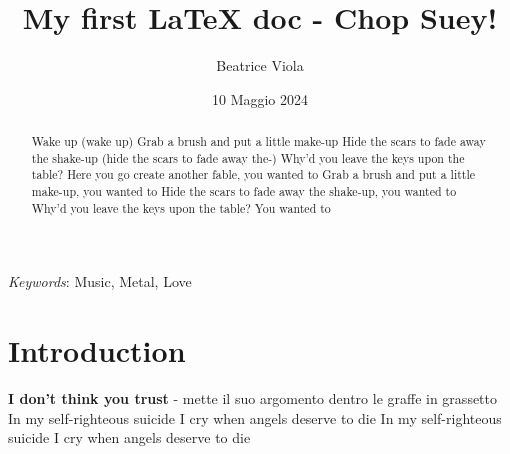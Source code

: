 \documentclass[12pt]{article}
\title{My first LaTeX doc - Chop Suey!}
\author{Beatrice Viola}
\date{10 Maggio 2024} %
\begin{document}

\maketitle %
\tableofcontents %

\begin{abstract}
 Wake up (wake up)
Grab a brush and put a little make-up
Hide the scars to fade away the shake-up (hide the scars to fade away the-)
Why'd you leave the keys upon the table?
Here you go create another fable, you wanted to
Grab a brush and put a little make-up, you wanted to
Hide the scars to fade away the shake-up, you wanted to
Why'd you leave the keys upon the table? You wanted to
\end{abstract}

\bigskip %

\textit{Keywords}: Music, Metal, Love %

\section{Introduction} %
\label{sec:intro} %

\textbf{I don't think you trust} - \textb mette il suo argomento dentro le graffe in grassetto
In my self-righteous suicide
I cry when angels deserve to die
In my self-righteous suicide
I cry when angels deserve to die
\end{document}
